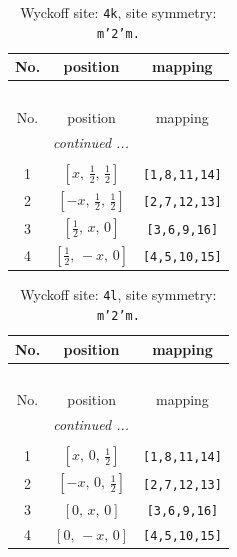 \documentclass[fleqn,8pt]{jsarticle}
\begin{document}
\renewcommand{\arraystretch}{1.2}
\begin{longtable}{ccc}
\caption{Wyckoff site: {\tt 4k}, site symmetry: {\tt m'2'm.}}
 \\
 \hline \hline
No. & position & mapping \\ \hline \endfirsthead

\multicolumn{2}{l}{\tablename\ \thetable{}} \\
 \hline \hline
No. & position & mapping \\ \hline \endhead

 \hline \hline
\multicolumn{2}{r}{\footnotesize\it continued ...} \\ \endfoot

 \hline \hline
\multicolumn{2}{r}{} \\ \endlastfoot

1 & $\left[ x,\, \frac{1}{2},\, \frac{1}{2} \right]$ & {\tt [1,8,11,14]} \\ \hline
2 & $\left[ - x,\, \frac{1}{2},\, \frac{1}{2} \right]$ & {\tt [2,7,12,13]} \\ \hline
3 & $\left[ \frac{1}{2},\, x,\, 0 \right]$ & {\tt [3,6,9,16]} \\ \hline
4 & $\left[ \frac{1}{2},\, - x,\, 0 \right]$ & {\tt [4,5,10,15]} \\
\end{longtable}
\renewcommand{\arraystretch}{1.2}
\begin{longtable}{ccc}
\caption{Wyckoff site: {\tt 4l}, site symmetry: {\tt m'2'm.}}
 \\
 \hline \hline
No. & position & mapping \\ \hline \endfirsthead

\multicolumn{2}{l}{\tablename\ \thetable{}} \\
 \hline \hline
No. & position & mapping \\ \hline \endhead

 \hline \hline
\multicolumn{2}{r}{\footnotesize\it continued ...} \\ \endfoot

 \hline \hline
\multicolumn{2}{r}{} \\ \endlastfoot

1 & $\left[ x,\, 0,\, \frac{1}{2} \right]$ & {\tt [1,8,11,14]} \\ \hline
2 & $\left[ - x,\, 0,\, \frac{1}{2} \right]$ & {\tt [2,7,12,13]} \\ \hline
3 & $\left[ 0,\, x,\, 0 \right]$ & {\tt [3,6,9,16]} \\ \hline
4 & $\left[ 0,\, - x,\, 0 \right]$ & {\tt [4,5,10,15]} \\
\end{longtable}
\end{document}
